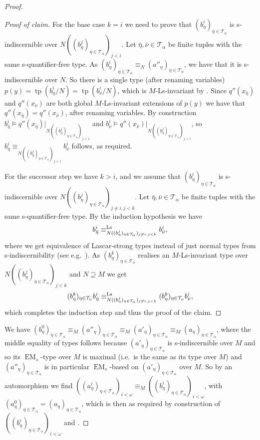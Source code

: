 \documentclass[a4paper, reqno]{amsart}
\theoremstyle{definition}
\theoremstyle{repeat}
\newcommand{\T}{\mathcal{T}}
\DeclareMathOperator{\tp}{tp}
\DeclareMathOperator{\EM}{EM}
\newcommand{\equivls}{\equiv^\textup{Ls}}
\begin{document}
\begin{proof}
\begin{proof}[Proof of claim]
For the base case $k = i$ we need to prove that  $(b^i_\eta)_{\eta \in \T_\alpha}$ is s-indiscernible over $N((b^j_\eta)_{\eta \in \T_\alpha})_{j < i}$. Let $\bar{\eta}, \bar{\nu} \in \T_\alpha$ be finite tuples with the same s-quantifier-free type. As $(b^i_\eta)_{\eta \in \T_\alpha} \equiv_N (a''_\eta)_{\eta \in \T_\alpha}$, we have that it is s-indiscernible over $N$. So there is a single type (after renaming variables) $p(y) = \tp(b^i_{\bar{\eta}}/N) = \tp(b^i_{\bar{\nu}}/N)$, which is $M$-Ls-invariant by . Since $q''(x_{\bar{\eta}})$ and $q''(x_{\bar{\nu}})$ are both global $M$-Ls-invariant extensions of $p(y)$ we have that $q''(x_{\bar{\eta}}) = q''(x_{\bar{\nu}})$, after renaming variables. By construction $b^i_{\bar{\eta}} \models q''(x_{\bar{\eta}})|_{N ((b^j_\eta)_{\eta \in \T_\alpha})_{j < i}}$ and $b^i_{\bar{\nu}} \models q''(x_{\bar{\nu}})|_{N ((b^j_\eta)_{\eta \in \T_\alpha})_{j < i}}$, so $b^i_{\bar{\eta}} \equiv_{N ((b^j_\eta)_{\eta \in \T_\alpha})_{j < i}} b^i_{\bar{\nu}}$ follows, as required.

For the successor step we have $k > i$, and we assume that $(b^i_\eta)_{\eta \in \T_\alpha}$ is s-indiscernible over $N((b^j_\eta)_{\eta \in \T_\alpha})_{j \neq i, j < k}$. Let $\bar{\eta}, \bar{\nu} \in \T_\alpha$ be finite tuples with the same s-quantifier-free type. By the induction hypothesis we have
\[
b^i_{\bar{\eta}} \equivls_{N ((b^j_\eta)_{\eta \in \T_\alpha})_{j \neq i, j < k}} b^i_{\bar{\nu}},
\]
where we get equivalence of Lascar-strong types instead of just normal types from s-indiscernibility (see e.g.\ \cite[Proposition 4.5]{kamsma_positive_2023}). As $(b^k_\eta)_{\eta \in \T_\alpha}$ realises an $M$-Ls-invariant type over $N ((b^j_\eta)_{\eta \in \T_\alpha})_{j < k}$ and $N \supseteq M$ we get
\[
(b^k_\eta)_{\eta \in \T_\alpha} b^i_{\bar{\eta}} \equivls_{N ((b^j_\eta)_{\eta \in \T_\alpha})_{j \neq i, j < k}} (b^k_\eta)_{\eta \in \T_\alpha} b^i_{\bar{\nu}},
\]
which completes the induction step and thus the proof of the claim.
\end{proof}
We have $(b^0_\eta)_{\eta \in \T_\alpha} \equiv_M (a''_\eta)_{\eta \in \T_\alpha} \equiv_M (a'_\eta)_{\eta \in \T_\alpha} \equiv_M (a_\eta)_{\eta \in \T_\alpha}$, where the middle equality of types follows because $(a'_\eta)_{\eta \in \T_\alpha}$ is s-indiscernible over $M$ and so its $\EM_s$-type over $M$ is maximal (i.e.\ is the same as its type over $M$) and $(a''_\eta)_{\eta \in \T_\alpha}$ is in particular $\EM_s$-based on $(a'_\eta)_{\eta \in \T_\alpha}$ over $M$. So by an automorphism we find $((a^i_\eta)_{\eta \in \T_\alpha})_{i < \omega} \equiv_M ((b^i_\eta)_{\eta \in \T_\alpha})_{i < \omega}$, with $(a^0_\eta)_{\eta \in \T_\alpha} = (a_\eta)_{\eta \in \T_\alpha}$, which is then as required by construction of $((b^i_\eta)_{\eta \in \T_\alpha})_{i < \omega}$ and .
\end{proof}
\end{document}
